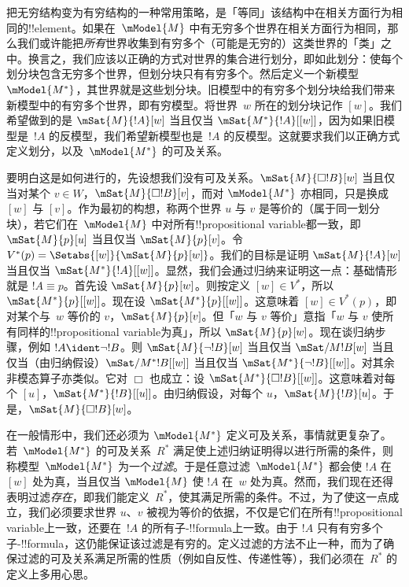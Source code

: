 \documentclass[../../../include/open-logic-section]{subfiles}
\begin{document}
把无穷结构变为有穷结构的一种常用策略，是「等同」该结构中在相关方面行为相同的!!{element}。如果在~$\mModel{M}$ 中有无穷多个世界在相关方面行为相同，那么我们或许能把\emph{所有}世界收集到有穷多个（可能是无穷的）这类世界的「类」之中。换言之，我们应该以正确的方式对世界的集合进行划分，即如此划分：使每个划分块包含无穷多个世界，但划分块只有有穷多个。然后定义一个新模型~$\mModel{M^*}$，其世界就是这些划分块。旧模型中的有穷多个划分块给我们带来新模型中的有穷多个世界，即有穷模型。将世界~$w$ 所在的划分块记作 $[w]$。我们希望做到的是 $\mSat{M}{!A}[w]$ 当且仅当 $\mSat{M^*}{!A}[{[w]}]$，因为如果旧模型是~$!A$ 的反模型，我们希望新模型也是~$!A$ 的反模型。这就要求我们以正确方式定义划分，以及~$\mModel{M^*}$ 的可及关系。

要明白这是如何进行的，先设想我们没有可及关系。$\mSat{M}{\Box !B}[w]$ 当且仅当对某个 $v \in W$，$\mSat{M}{\Box !B}[v]$，而对 $\mModel{M^*}$ 亦相同，只是换成 $[w]$ 与 $[v]$。作为最初的构想，称两个世界 $u$ 与 $v$ 是等价的（属于同一划分块），若它们在~$\mModel{M}$ 中对所有!!{propositional variable}都一致，即 $\mSat{M}{p}[u]$ 当且仅当 $\mSat{M}{p}[v]$。令 $V^*(p) = \Setabs{[w]}{\mSat{M}{p}[w]}$。我们的目标是证明 $\mSat{M}{!A}[w]$ 当且仅当 $\mSat{M^*}{!A}[{[w]}]$。显然，我们会通过归纳来证明这一点：基础情形就是 $!A \equiv p$。首先设 $\mSat{M}{p}[w]$。则按定义 $[w] \in V^*$，所以 $\mSat{M^*}{p}[{[w]}]$。现在设 $\mSat{M^*}{p}[{[w]}]$。这意味着 $[w] \in V^*(p)$，即对某个与~$w$ 等价的 $v$，$\mSat{M}{p}[v]$。但「$w$ 与 $v$ 等价」意指「$w$ 与 $v$ 使所有同样的!!{propositional variable}为真」，所以 $\mSat{M}{p}[w]$。现在谈归纳步骤，例如 $!A \ident \lnot !B$。则 $\mSat{M}{\lnot !B}[w]$ 当且仅当 $\mSat/{M}{!B}[w]$ 当且仅当（由归纳假设）$\mSat/{M^*}{!B}[{[w]}]$ 当且仅当 $\mSat{M^*}{\lnot !B}[{[w]}]$。对其余非模态算子亦类似。它对 $\Box$ 也成立：设 $\mSat{M^*}{\Box !B}[{[w]}]$。这意味着对每个 $[u]$，$\mSat{M^*}{!B}[{[u]}]$。由归纳假设，对每个 $u$，$\mSat{M}{!B}[u]$。于是，$\mSat{M}{\Box !B}[w]$。

在一般情形中，我们还必须为 $\mModel{M^*}$ 定义可及关系，事情就更复杂了。若~$\mModel{M^*}$ 的可及关系~$R^*$ 满足使上述归纳证明得以进行所需的条件，则称模型~$\mModel{M^*}$ 为一个\emph{过滤}。于是任意过滤~$\mModel{M^*}$ 都会使 $!A$ 在 $[w]$ 处为真，当且仅当 $\mModel{M}$ 使 $!A$ 在~$w$ 处为真。然而，我们现在还得表明过滤\emph{存在}，即我们能定义~$R^*$，使其满足所需的条件。不过，为了使这一点成立，我们必须要求世界 $u$、$v$ 被视为等价的依据，不仅是它们在所有!!{propositional variable}上一致，还要在~$!A$ 的所有子-!!{formula}上一致。由于 $!A$ 只有有穷多个子-!!{formula}，这仍能保证该过滤是有穷的。定义过滤的方法不止一种，而为了确保过滤的可及关系满足所需的性质（例如自反性、传递性等），我们必须在~$R^*$ 的定义上多用心思。
\end{document}
